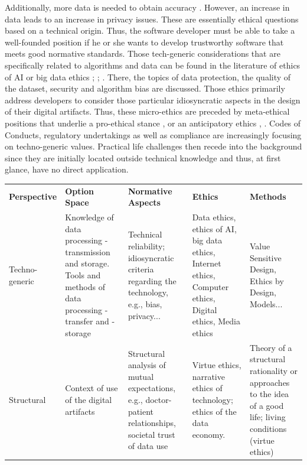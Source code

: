 \documentclass[manuscript,screen]{acmart}
\begin{document}
Additionally, more data is needed to obtain accuracy \citep{raji2020saving}. However, an increase in  data leads to an increase in privacy issues. These are essentially ethical questions based on a technical origin. Thus, the software developer must be able to take a well-founded position if he or she wants to develop trustworthy software that meets good normative standards. Those tech-generic considerations that are specifically related to algorithms and data can be found in the literature of ethics of AI or big data ethics \citep{arnold2018big}; \citep{floridi2018ai4people}; \citep{morley2021initial}. There, the topics of data protection, the quality of the dataset, security and algorithm bias are discussed. Those ethics primarily address developers to consider those particular idiosyncratic aspects in the design of their digital artifacts. Thus, these micro-ethics are preceded by meta-ethical positions that underlie a pro-ethical stance \citep{floridi2016tolerant}, \citep{turilli2009ethics} or an anticipatory ethics \citep{brey2012anticipating}, \citep{brey2012anticipatory}. Codes of Conducts, regulatory undertakings as well as compliance are increasingly focusing on techno-generic values. Practical life challenges then recede into the background since they are initially located outside technical knowledge and thus, at first glance, have no direct application. 
\begin{table}[t]
  \begin{tabular}{p{.1\linewidth}|p{.2\linewidth}|p{.2\linewidth}|p{.2\linewidth}|p{.2\linewidth} }
    \rowcolor{gray!50}
    \textbf{Perspective}&
\textbf{Option Space}&
\textbf{Normative Aspects}&
\textbf{Ethics}&
\textbf{Methods}\\
Techno-generic&
Knowledge of data processing -transmission and storage. Tools and methods of data processing -transfer and -storage&
Technical reliability; idiosyncratic criteria regarding the technology, e.g., bias, privacy...&
Data ethics, ethics of AI, big data ethics, Internet ethics, Computer ethics, Digital ethics, Media ethics&
Value Sensitive Design, Ethics by Design, Models...\\
Structural&
Context of use of the digital artifacts&
Structural analysis of mutual expectations, e.g., doctor-patient relationships, societal trust of data use&
Virtue ethics, narrative ethics of technology; ethics of the data economy.&
Theory of a structural rationality or approaches to the idea of a good life; living conditions (virtue ethics)\\
 \end{tabular}
  \end{table}
\end{document}
